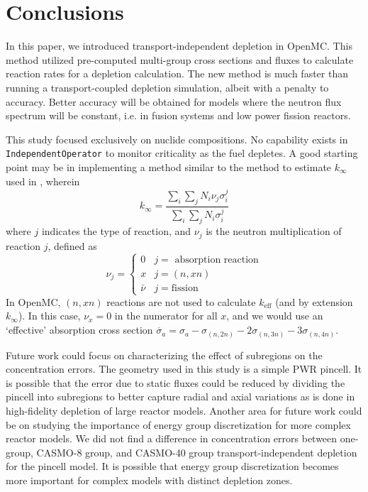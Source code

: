 \section{Conclusions}\label{sec:conclusion}
    In this paper, we introduced transport-independent depletion in OpenMC. This
    method utilized pre-computed multi-group cross sections and fluxes to
    calculate reaction rates for a depletion calculation. The new method is much
    faster than running a transport-coupled depletion simulation, albeit with a
    penalty to accuracy. Better accuracy will be obtained for models where the
    neutron flux spectrum will be constant, i.e. in fusion systems and low power
    fission reactors.
         
    This study focused exclusively on nuclide compositions. No capability exists
    in \verb.IndependentOperator. to monitor criticality as the fuel depletes. A
    good starting point may be in implementing a method similar to the method to
    estimate $k_{\infty}$ used in \cite{LOVECKY2014333}, wherein
    \begin{equation}
        k_{\infty} = \frac{\sum_{i} \sum_{j} N_{i} \nu_{j}
        \sigma_{i}^{j}}{\sum_{i}\sum_{j} N_{i} \sigma_{i}^{j}}  
    \end{equation}
    where $j$ indicates the type of reaction, and $\nu_{j}$ is the neutron
    multiplication of reaction $j$, defined as
    \begin{equation}
        \nu_j = \begin{cases}
            0 & j=\text{ absorption reaction}\\
            x & j=(n,xn)\\
            \bar{\nu} & j=\text{fission}
        \end{cases}
    \end{equation}
    In OpenMC, $(n,xn)$ reactions are not used to calculate $k_\text{eff}$ (and
    by extension $k_{\infty}$). In this case, $\nu_{x} = 0$ in the numerator for
    all $x$, and we would use an `effective' absorption cross section
    $\overline{\sigma}_{a} = \sigma_{a} - \sigma_{(n,2n)} - 2\sigma_{(n,3n)} -
    3\sigma_{(n,4n)}$. 

    Future work could focus on characterizing the effect of subregions on the
    concentration errors. The geometry used in this study is a simple PWR
    pincell. It is possible that the error due to static fluxes could be reduced
    by dividing the pincell into subregions to better capture radial and axial
    variations as is done in high-fidelity depletion of large reactor models.
    Another area for future work could be on studying the importance of energy
    group discretization for more complex reactor models. We did not find a
    difference in concentration errors between one-group, CASMO-8 group, and
    CASMO-40 group transport-independent depletion for the pincell model. It is
    possible that energy group discretization becomes more important for complex
    models with distinct depletion zones.    
